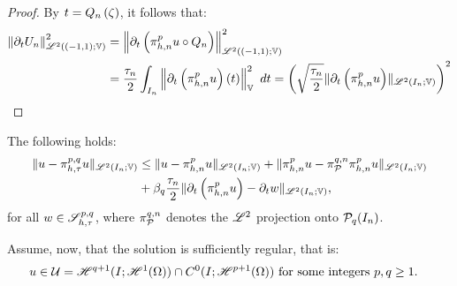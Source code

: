 \begin{proof}
    By $t = Q_n \left( \zeta \right)$, it follows that:
    \begin{align*}
        \left\lVert \partial_t U_n \right\rVert_{\mathscr{L}^{2}((-1, 1); \mathbb{V})}^2 &= \left\lVert \partial_t \left( \pi_{h, n}^p u \circ Q_n \right) \right\rVert_{\mathscr{L}^{2}((-1, 1); \mathbb{V})}^2 \\
        &= \frac{\tau_n}{2} \int_{I_n} \left\lVert  \partial_t \left( \pi_{h, n}^p u \right) (t)  \right\rVert_{\mathbb{V}}^2 ~ dt = \left( \sqrt{\frac{\tau_n}{2}} \lVert \partial_t \left( \pi_{h, n}^p u \right) \rVert_{\mathscr{L}^{2}(I_n; \mathbb{V})} \right)^2
    \end{align*}
\end{proof}

\newpage
\begin{lemma}
    The following holds:
    \begin{align}
        \lVert u - \pi_{h, \tau}^{p, q} u \rVert_{\mathscr{L}^{2}(I_n; \mathbb{V})} &\leq \lVert u - \pi_{h, n}^p u \rVert_{\mathscr{L}^{2}(I_n; \mathbb{V})} + \lVert \pi_{h, n}^p u - \pi_{\mathcal{P}_{}}^{q, n} \pi_{h, n}^p u \rVert_{\mathscr{L}^{2}(I_n; \mathbb{V})} \\
        &+ \beta_{q} \frac{\tau_n}{2} \lVert \partial_t \left( \pi_{h, n}^p u \right) - \partial_t w \rVert_{\mathscr{L}^{2}(I_n; \mathbb{V})}, \notag
    \end{align}
    for all $w \in \mathscr{S}^{p, q}_{h, \tau}$, where $\pi_{\mathcal{P}_{}}^{q, n}$ denotes the $\mathscr{L}^{2}$ projection onto $\mathcal{P}_{q}(I_n)$.
\end{lemma}

Assume, now, that the solution is sufficiently regular, that is:
\begin{align}
    u \in \mathcal{U} = \mathscr{H}^{q + 1}(I; \mathscr{H}^{1}(\Omega)) \cap C^0(I; \mathscr{H}^{p + 1}(\Omega)) &\text{ for some integers } p, q \geq 1.
\end{align}

